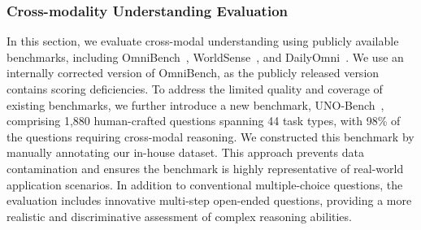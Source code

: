 \documentclass{article}
\begin{document}

\subsubsection{Cross-modality Understanding Evaluation}
In this section, we evaluate cross-modal understanding using publicly available benchmarks, including OmniBench~\citep{omnibench}, WorldSense~\citep{worldsense}, and DailyOmni~\citep{zhou2025dailyomni}. We use an internally corrected version of OmniBench, as the publicly released version contains scoring deficiencies. 
To address the limited quality and coverage of existing benchmarks, we further introduce a new benchmark, UNO-Bench~\citep{chen2025unobench}, comprising 1,880 human-crafted questions spanning 44 task types, with 98\% of the questions requiring cross-modal reasoning.
We constructed this benchmark by manually annotating our in-house dataset. This approach prevents data contamination and ensures the benchmark is highly representative of real-world application scenarios.
In addition to conventional multiple-choice questions, the evaluation includes innovative multi-step open-ended questions, providing a more realistic and discriminative assessment of complex reasoning abilities.
\end{document}
